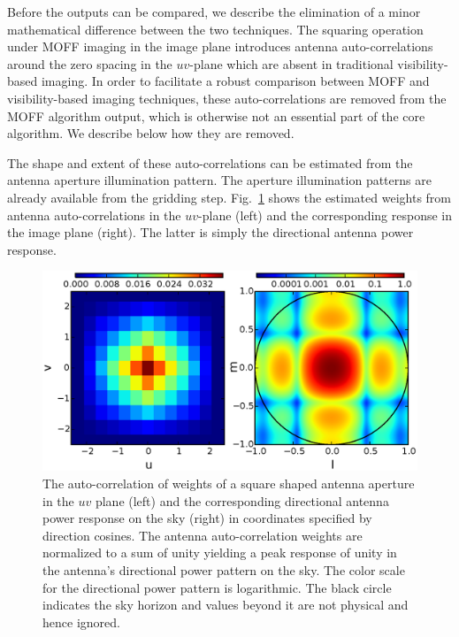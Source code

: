 \documentclass[a4paper,fleqn,usenatbib]{mnras}
\begin{document}
Before the outputs can be compared, we describe the elimination of a minor 
mathematical difference between the two techniques. The squaring operation under 
MOFF imaging in the image plane introduces antenna auto-correlations around the 
zero spacing in the $uv$-plane which are absent in traditional visibility-based 
imaging. In order to facilitate a robust comparison between MOFF and 
visibility-based imaging techniques, these auto-correlations are removed from 
the MOFF algorithm output, which is otherwise not an essential part of the core 
algorithm. We describe below how they are removed. 

The shape and extent of these auto-correlations can be estimated from the 
antenna aperture illumination pattern. The aperture illumination patterns
are already available from the gridding step. Fig.~\ref{fig:autocorr_wts_PB} 
shows the estimated weights from antenna auto-correlations in the $uv$-plane 
(left) and the corresponding response in the image plane (right). The latter 
is simply the directional antenna power response. 

\begin{figure}
  \includegraphics[width=\columnwidth]{figure5}
  \caption{The auto-correlation of weights of a square shaped antenna aperture
    in the $uv$ plane (left) and the corresponding directional antenna power 
    response on the sky (right) in coordinates specified by direction cosines. 
    The antenna auto-correlation weights are normalized to a sum
    of unity yielding a peak response of unity in the antenna's directional
    power pattern on the sky. The color scale for the directional power 
    pattern is logarithmic. The black circle indicates the sky horizon and
    values beyond it are not physical and hence ignored.}
  \label{fig:autocorr_wts_PB}
\end{figure}
\end{document}
